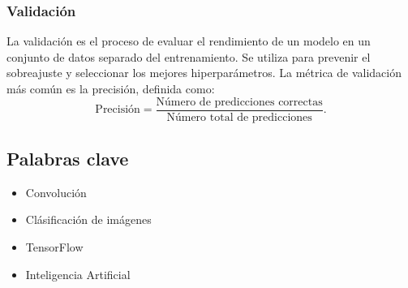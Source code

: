 \documentclass[../main.tex]{subfiles}
\begin{document}
\subsubsection{Validación}

La validación es el proceso de evaluar el rendimiento de un modelo en un conjunto de datos separado del entrenamiento. Se utiliza para prevenir el sobreajuste y seleccionar los mejores hiperparámetros. La métrica de validación más común es la precisión, definida como:
\[
\text{Precisión} = \frac{\text{Número de predicciones correctas}}{\text{Número total de predicciones}}.
\]

\subsection{Palabras clave}

\begin{itemize}
    \item Convolución
    \item Clásificación de imágenes
    \item TensorFlow
    \item Inteligencia Artificial
\end{itemize}
\end{document}

